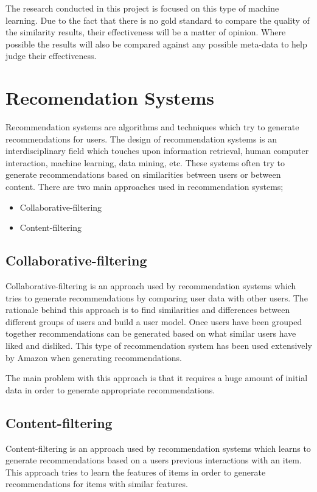 The research conducted in this project is focused on this type of machine learning.
Due to the fact that there is no gold standard to compare the quality of the similarity results, their effectiveness will be a matter of opinion.
Where possible the results will also be compared against any possible meta-data to help judge their effectiveness.

\section{Recomendation Systems}
Recommendation systems are algorithms and techniques which try to generate recommendations for users.
The design of recommendation systems is an interdisciplinary field which touches upon information retrieval, human computer interaction, machine learning, data mining, etc.
These systems often try to generate recommendations based on similarities between users or between content.
There are two main approaches used in recommendation systems;

\begin{itemize}
    \item Collaborative-filtering
    \item Content-filtering
\end{itemize}

\subsection{Collaborative-filtering}
Collaborative-filtering is an approach used by recommendation systems which tries to generate recommendations by comparing user data with other users.
The rationale behind this approach is to find similarities and differences  between different groups of users and build a user model.
Once users have been grouped together recommendations can be generated based on what similar users have liked and disliked.
This type of recommendation system has been used extensively by Amazon when generating recommendations.

The main problem with this approach is that it requires a huge amount of initial data in order to generate appropriate recommendations.

\subsection{Content-filtering}
Content-filtering is an approach used by recommendation systems which learns to generate recommendations based on a users previous interactions with an item.
This approach tries to learn the features of items in order to generate recommendations for items with similar features.

